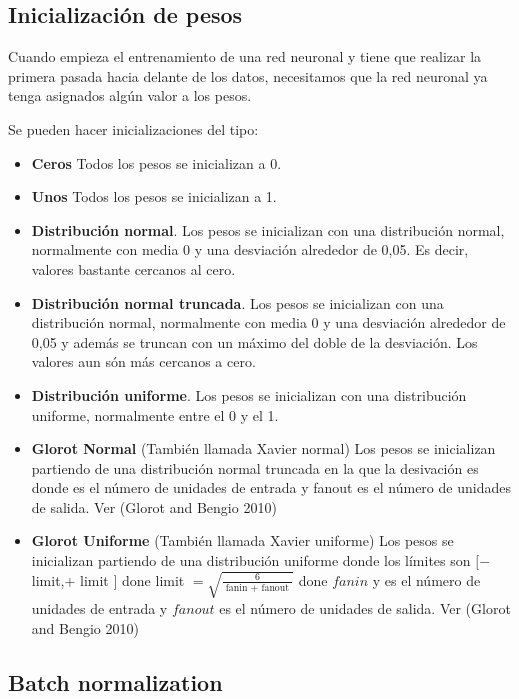 \documentclass[
  a4paper,
  DIV=11,
  numbers=noendperiod]{scrreprt}
\begin{document}
\subsection{Inicialización de pesos}\label{inicializaciuxf3n-de-pesos}

Cuando empieza el entrenamiento de una red neuronal y tiene que realizar
la primera pasada hacia delante de los datos, necesitamos que la red
neuronal ya tenga asignados algún valor a los pesos.

Se pueden hacer inicializaciones del tipo:

\begin{itemize}
\item
  \textbf{Ceros} Todos los pesos se inicializan a 0.
\item
  \textbf{Unos} Todos los pesos se inicializan a 1.
\item
  \textbf{Distribución normal}. Los pesos se inicializan con una
  distribución normal, normalmente con media 0 y una desviación
  alrededor de 0,05. Es decir, valores bastante cercanos al cero.
\item
  \textbf{Distribución normal truncada}. Los pesos se inicializan con
  una distribución normal, normalmente con media 0 y una desviación
  alrededor de 0,05 y además se truncan con un máximo del doble de la
  desviación. Los valores aun són más cercanos a cero.
\item
  \textbf{Distribución uniforme}. Los pesos se inicializan con una
  distribución uniforme, normalmente entre el 0 y el 1.
\item
  \textbf{Glorot Normal} (También llamada Xavier normal) Los pesos se
  inicializan partiendo de una distribución normal truncada en la que la
  desivación es donde es el número de unidades de entrada y fanout es el
  número de unidades de salida. Ver (Glorot and Bengio 2010)
\item
  \textbf{Glorot Uniforme} (También llamada Xavier uniforme) Los pesos
  se inicializan partiendo de una distribución uniforme donde los
  límites son \([-\) limit,+ limit \(]\) done limit
  \(=\sqrt{\frac{6}{\text { fanin }+ \text { fanout }}}\) done \(fanin\)
  y es el número de unidades de entrada y \(fanout\) es el número de
  unidades de salida. Ver (Glorot and Bengio 2010)
\end{itemize}

\subsection{Batch normalization}\label{batch-normalization}
\end{document}
